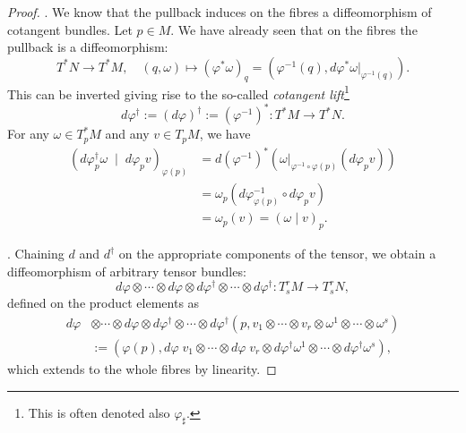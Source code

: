 \begin{proof}
  .
  We know that the pullback induces on the fibres a diffeomorphism of cotangent bundles. Let $p\in M$.
  We have already seen that on the fibres the pullback is a diffeomorphism:
  \begin{equation}
    T^*N \to T^* M, \quad
    (q,\omega) \mapsto (\varphi^*\omega)_q = \left(\varphi^{-1}(q), d\varphi^*\omega|_{\varphi^{-1}(q)}\right).
  \end{equation}
  This can be inverted giving rise to the so-called \emph{cotangent lift}\footnote{This is often denoted also $\varphi_\sharp$.}
  \begin{equation}
    d\varphi^\dagger :=(d\varphi)^\dagger := (\varphi^{-1})^*: T^*M \to T^*N.
  \end{equation}
  For any $\omega\in T_p^* M$ and any $v\in T_pM$, we have
  \begin{align}
    (d\varphi^\dagger_p \omega \;\mid\; d\varphi_p v)_{\varphi(p)} & =  d(\varphi^{-1})^*(\omega|_{\varphi^{-1}\circ\varphi(p)} (d\varphi_p v) ) \\
                                                                   & = \omega_p(d\varphi^{-1}_{\varphi(p)} \circ d\varphi_p v )                  \\
                                                                   & = \omega_p(v) = (\omega \mid v)_p.
  \end{align}

  .
  Chaining $d$ and $d^\dagger$ on the appropriate components of the tensor, we obtain a diffeomorphism of arbitrary tensor bundles:
  \begin{equation}
    d\varphi \otimes\cdots\otimes d\varphi \otimes d\varphi^\dagger \otimes\cdots\otimes d\varphi^\dagger  : T_s^rM \to T_s^r N,
  \end{equation}
  defined on the product elements as
  \begin{align}
    d\varphi & \otimes\cdots\otimes d\varphi \otimes d\varphi^\dagger \otimes\cdots\otimes d\varphi^\dagger  (p, v_1 \otimes \cdots\otimes v_r \otimes \omega^1\otimes\cdots\otimes\omega^s) \\
             & := (\varphi(p), d\varphi\; v_1 \otimes \cdots\otimes d\varphi\; v_r \otimes d\varphi^\dagger \omega^1\otimes\cdots\otimes d\varphi^\dagger \omega^s),
  \end{align}
  which extends to the whole fibres by linearity.
\end{proof}

